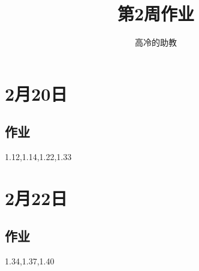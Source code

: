 \documentclass{article}
\title{第2周作业}
\author{高冷的助教}
\begin{document}
\maketitle
\section{2月20日}
\subsection*{作业}
1.12,1.14,1.22,1.33
\section{2月22日}
\subsection*{作业}
1.34,1.37,1.40
\end{document}
